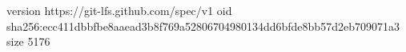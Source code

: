 version https://git-lfs.github.com/spec/v1
oid sha256:ecc411dbbfbe8aaead3b8f769a52806704980134dd6bfde8bb57d2eb709071a3
size 5176
